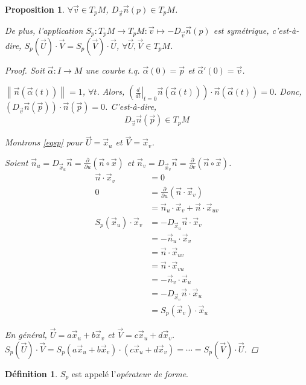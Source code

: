 \documentclass{report}
\newtheorem*{prop}{Proposition}
\theoremstyle{definition}
\newtheorem*{dfn}{D\'efinition}
\theoremstyle{remark}
\newcommand*{\norme}[1]{\left\|#1\right\|}
\begin{document}
	\begin{prop}
		$\forall\vec v\in T_pM$, $D_{\vec v}\vec n(p) \in T_pM$.

		De plus, l'application $S_p : T_pM \to T_pM : \vec v\mapsto-D_{\vec v}\vec n(p)$ est sym\'etrique, c'est-\`a-dire, $S_p(\vec U)\cdot\vec V=S_p(\vec V)\cdot\vec U$, $\forall\vec U,\vec V \in T_pM$.
		\begin{proof}
			Soit $\vec\alpha:I\to M$ une courbe t.q. $\vec\alpha(0)=\vec p$ et $\vec\alpha'(0)=\vec v$.

			$\norme{\vec n(\vec\alpha(t))}=1$, $\forall t$. Alors, $\left(\left.\frac{d}{dt}\right|_{t=0}\vec n(\vec\alpha(t))\right) \cdot \vec n(\vec\alpha(t))=0$. Donc, $(D_{\vec v}\vec n(\vec p)) \cdot \vec n(\vec p)=0$. C'est-\`a-dire,
			\begin{equation}
				D_{\vec v}\vec n(\vec p)\in T_pM
				\tag{$*$}
				\label{eqsp}
			\end{equation}

			Montrons \eqref{eqsp} pour $\vec U=\vec x_u$ et $\vec V=\vec x_v$.

			Soient $\vec n_u=D_{\vec x_u}\vec n = \frac{\partial}{\partial u}(\vec n\circ\vec x)$ et $\vec n_v=D_{\vec x_v}\vec n = \frac{\partial}{\partial v}(\vec n\circ\vec x)$.
			\begin{align*}
				\vec n\cdot\vec x_v&= 0\\
				0&= \frac{\partial}{\partial u}(\vec n\cdot\vec x_v)\\
				&= \vec n_u\cdot\vec x_v + \vec n\cdot\vec x_{uv}\\
				S_p(\vec x_u)\cdot\vec x_v&= -D_{\vec x_u}\vec n\cdot\vec x_v\\
				&= -\vec n_u\cdot \vec x_v\\
				&= \vec n\cdot\vec x_{uv}\\
				&= \vec n\cdot\vec x_{vu}\\
				&= -\vec n_v\cdot\vec x_u\\
				&= -D_{\vec x_v}\vec n\cdot\vec x_u\\
				&= S_p(\vec x_v)\cdot\vec x_u
			\end{align*}

			En g\'en\'eral, $\vec U=a\vec x_u+b\vec x_v$ et $\vec V=c\vec x_u+d\vec x_v$. $S_p(\vec U)\cdot\vec V = S_p(a\vec x_u+b\vec x_v) \cdot (c\vec x_u+d\vec x_v) = \cdots = S_p(\vec V)\cdot\vec U$.
		\end{proof}
	\end{prop}

	\begin{dfn}
		$S_p$ est appel\'e l'\emph{op\'erateur de forme}.
	\end{dfn}
\end{document}
